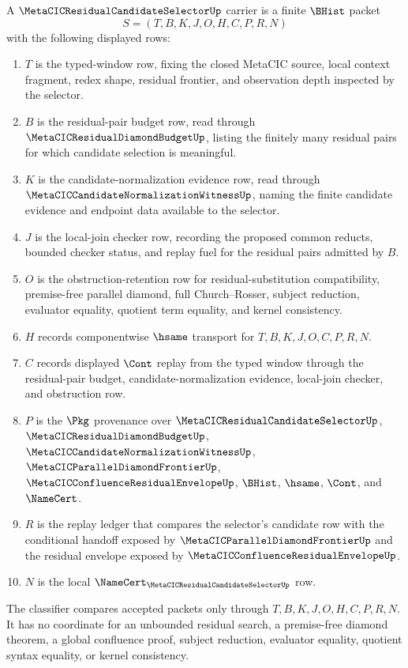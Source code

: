 \begin{definition}
\label{def:metacic-residual-candidate-selector-carrier}
A $\MetaCICResidualCandidateSelectorUp$ carrier is a finite $\BHist$ packet
$$
S=(T,B,K,J,O,H,C,P,R,N)
$$
with the following displayed rows:
\begin{enumerate}
\item $T$ is the typed-window row, fixing the closed MetaCIC source, local context fragment, redex shape, residual frontier, and observation depth inspected by the selector.
\item $B$ is the residual-pair budget row, read through $\MetaCICResidualDiamondBudgetUp$, listing the finitely many residual pairs for which candidate selection is meaningful.
\item $K$ is the candidate-normalization evidence row, read through $\MetaCICCandidateNormalizationWitnessUp$, naming the finite candidate evidence and endpoint data available to the selector.
\item $J$ is the local-join checker row, recording the proposed common reducts, bounded checker status, and replay fuel for the residual pairs admitted by $B$.
\item $O$ is the obstruction-retention row for residual-substitution compatibility, premise-free parallel diamond, full Church--Rosser, subject reduction, evaluator equality, quotient term equality, and kernel consistency.
\item $H$ records componentwise $\hsame$ transport for $T,B,K,J,O,C,P,R,N$.
\item $C$ records displayed $\Cont$ replay from the typed window through the residual-pair budget, candidate-normalization evidence, local-join checker, and obstruction row.
\item $P$ is the $\Pkg$ provenance over $\MetaCICResidualCandidateSelectorUp$, $\MetaCICResidualDiamondBudgetUp$, $\MetaCICCandidateNormalizationWitnessUp$, $\MetaCICParallelDiamondFrontierUp$, $\MetaCICConfluenceResidualEnvelopeUp$, $\BHist$, $\hsame$, $\Cont$, and $\NameCert$.
\item $R$ is the replay ledger that compares the selector's candidate row with the conditional handoff exposed by $\MetaCICParallelDiamondFrontierUp$ and the residual envelope exposed by $\MetaCICConfluenceResidualEnvelopeUp$.
\item $N$ is the local $\NameCert_{\MetaCICResidualCandidateSelectorUp}$ row.
\end{enumerate}
The classifier compares accepted packets only through $T,B,K,J,O,H,C,P,R,N$. It has no coordinate for an unbounded residual search, a premise-free diamond theorem, a global confluence proof, subject reduction, evaluator equality, quotient syntax equality, or kernel consistency.
\end{definition}


